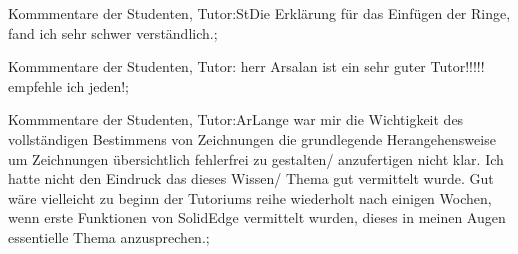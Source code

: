 \documentclass[10pt]{beamer}
\begin{document}
\begin{frame}[fragile]{Kommmentare der Studenten, Tutor:St}Die Erklärung für das Einfügen der Ringe, fand ich sehr schwer verständlich.;
 \end{frame}
\begin{frame}[fragile]{Kommmentare der Studenten, Tutor: }herr Arsalan ist ein sehr guter Tutor!!!!! empfehle ich jeden!;
 \end{frame}
\begin{frame}[fragile]{Kommmentare der Studenten, Tutor:Ar}Lange war mir die Wichtigkeit des vollständigen Bestimmens von Zeichnungen   die grundlegende Herangehensweise um Zeichnungen übersichtlich   fehlerfrei zu gestalten/ anzufertigen nicht klar.   Ich hatte nicht den Eindruck das dieses Wissen/ Thema gut vermittelt wurde.  Gut wäre vielleicht zu beginn der Tutoriums reihe   wiederholt nach einigen Wochen, wenn erste Funktionen von SolidEdge vermittelt wurden, dieses in meinen Augen essentielle Thema anzusprechen.;
 \end{frame}
\end{document}
